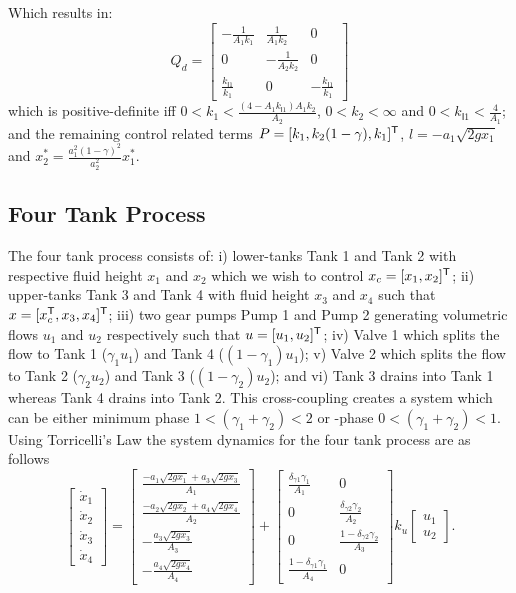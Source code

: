 Which results in:
\begin{equation*}
Q_d = \begin{bmatrix}
-\frac{1}{A_1 k_1} & \frac{1}{A_1 k_2} &  0\\
0 & -\frac{1}{A_2 k_2} &  0\\
\frac{k_{\mathsf{I}1}}{k_1} &  0 & -\frac{k_{\mathsf{I}1}}{k_1}
\end{bmatrix}
\end{equation*}
which is positive-definite iff $0 < k_1 < \frac{\left (4 - A_1 k_{\mathsf{I}1} \right
  )A_1k_2}{A_2}$, $0 < k_2 < \infty$ and $0 < k_{\mathsf{I}1} < \frac{4}{A_1}$;
and the remaining control related terms  
$P=[k_1,k_2(1-\gamma),k_1]^{\mathsf{T}}$, $l=-a_1\sqrt{2gx_1}$ and
$x_2^*=\frac{a_1^2(1-\gamma)^2}{a_2^2}x_1^*$.
\subsection{Four Tank Process}
\label{S:four_tank}
The four tank process consists of: i) lower-tanks Tank 1 and Tank 2
with respective fluid height $x_1$ and $x_2$ which we wish to control
$x_c=[x_1,x_2]^{\mathsf{T}}$; ii) upper-tanks Tank 3 and Tank 4 with fluid
height $x_3$ and $x_4$ such that $x=[x_c^{\mathsf{T}},x_3,x_4]^{\mathsf{T}}$; iii)
two gear pumps Pump 1 and Pump 2 generating volumetric flows $u_1$ and
$u_2$ respectively such that $u=[u_1,u_2]^{\mathsf{T}}$; iv) Valve 1 which
splits the flow to Tank 1 ($\gamma_1 u_1$) and Tank 4
($(1-\gamma_1)u_1$); v) Valve 2 which splits the flow to Tank 2
($\gamma_2 u_2$) and Tank 3 ($(1-\gamma_2) u_2$); and vi) Tank 3
drains into Tank 1 whereas Tank 4 drains into Tank 2.  This
cross-coupling creates a system which can be either minimum phase
$1<(\gamma_1+\gamma_2)<2$ or \nonminimum-phase $0<(\gamma_1 +
\gamma_2)<1$.  Using Torricelli's Law the system dynamics for the four
tank process are as follows
\begin{equation}
\label{E:four_tank}
\begin{bmatrix}
\dot{x}_1\\
\dot{x}_2\\
\dot{x}_3\\
\dot{x}_4
\end{bmatrix}=
\begin{bmatrix}
\frac{-a_1 \sqrt{2gx_1} + a_3 \sqrt{2gx_3}}{A_1} \\
\frac{-a_2 \sqrt{2gx_2} + a_4 \sqrt{2gx_4}}{A_2} \\
-\frac{a_3 \sqrt{2gx_3}}{A_3} \\
-\frac{a_4 \sqrt{2gx_4}}{A_4} 
\end{bmatrix}+
\begin{bmatrix}
\frac{\delta_{\gamma 1} \gamma_1}{A_1} & 0\\
0 & \frac{\delta_{\gamma 2} \gamma_2}{A_2} \\
0 & \frac{1 - \delta_{\gamma 2} \gamma_2}{A_3}\\
\frac{1 - \delta_{\gamma 1} \gamma_1}{A_4} & 0
\end{bmatrix} k_u
\begin{bmatrix}
 u_1\\
 u_2
\end{bmatrix}.
\end{equation}  
